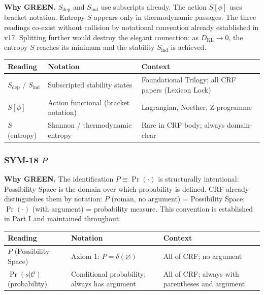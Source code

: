 \documentclass[12pt, a4paper]{article}
\begin{document}
\begin{greenbox}[title={SYM-17 \textmd{---} $S$ \textmd{(action / entropy / stability — intentional)}}]
\textbf{Why GREEN.} $S_{\text{dep}}$ and $S_{\text{ind}}$ use
subscripts already. The action $S[\phi]$ uses bracket notation.
Entropy $S$ appears only in thermodynamic passages. The three
readings co-exist without collision by notational convention already
established in v17. Splitting further would destroy the elegant
connection: as $D_{\text{KL}} \to 0$, the entropy $S$ reaches its
minimum and the stability $S_{\text{ind}}$ is achieved.

\medskip
\renewcommand{\arraystretch}{1.35}
\begin{tabular}{p{2.8cm} p{4.5cm} p{4.5cm}}
\toprule
\textbf{Reading} & \textbf{Notation} & \textbf{Context}\\
\midrule
$S_{\text{dep}}$ / $S_{\text{ind}}$ &
  Subscripted stability states &
  Foundational Trilogy; all CRF papers (Lexicon Lock)\\
$S[\phi]$ &
  Action functional (bracket notation) &
  Lagrangian, Noether, Z-programme\\
$S$ (entropy) &
  Shannon / thermodynamic entropy &
  Rare in CRF body; always domain-clear\\
\bottomrule
\end{tabular}
\end{greenbox}

\subsubsection*{SYM-18 \quad $P$}

\begin{greenbox}[title={SYM-18 \textmd{---} $P$ \textmd{(Possibility Space vs probability — intentional)}}]
\textbf{Why GREEN.} The identification $P \equiv \Pr(\cdot)$ is
structurally intentional: Possibility Space is the domain over which
probability is defined. CRF already distinguishes them by notation:
$P$ (roman, no argument) = Possibility Space;
$\Pr(\cdot)$ (with argument) = probability measure.
This convention is established in Part I and maintained throughout.

\medskip
\renewcommand{\arraystretch}{1.35}
\begin{tabular}{p{2.8cm} p{4.5cm} p{4.5cm}}
\toprule
\textbf{Reading} & \textbf{Notation} & \textbf{Context}\\
\midrule
$P$ (Possibility Space) &
  Axiom 1: $P = \delta(\varnothing)$ &
  All of CRF; no argument\\
$\Pr(s|\mathcal{C})$ (probability) &
  Conditional probability; always has argument &
  All of CRF; always with parentheses and argument\\
\bottomrule
\end{tabular}
\end{greenbox}
\end{document}
